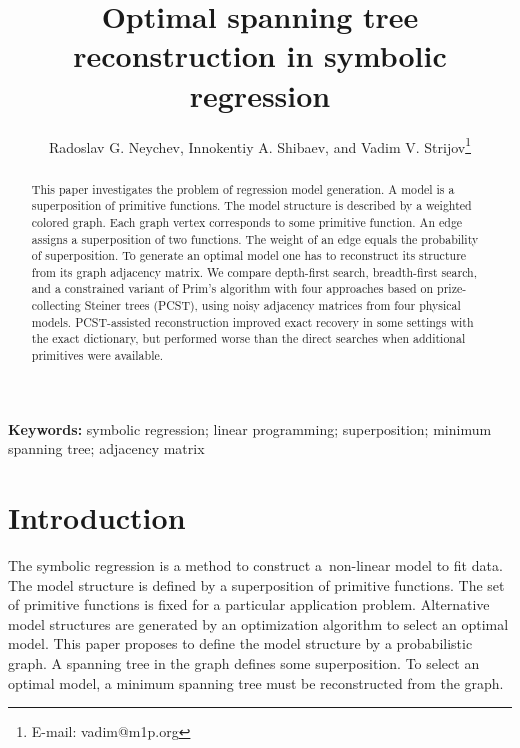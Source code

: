 \documentclass[12pt]{article}
\newif\ifhighlight \highlighttrue
\begin{document}
\title{Optimal spanning tree reconstruction in symbolic regression}
\author{Radoslav G. Neychev, Innokentiy A. Shibaev, and Vadim V. Strijov\footnote{E-mail: vadim@m1p.org}}
\maketitle

\begin{abstract}
This paper investigates the problem of regression model generation. A model is a superposition of primitive functions. The model structure is described by a weighted colored graph. Each graph vertex corresponds to some primitive function. An edge assigns a superposition of two functions. The weight of an edge equals the probability of superposition. To generate an optimal model one has to reconstruct its structure from its graph adjacency matrix.
{\ifhighlight\color{blue}\fi We compare depth-first search, breadth-first search, and a constrained variant of Prim's algorithm with four approaches based on prize-collecting Steiner trees (PCST), using noisy adjacency matrices from four physical models. PCST-assisted reconstruction improved exact recovery in some settings with the exact dictionary, but performed worse than the direct searches when additional primitives were available.}
\end{abstract}

{\bf Keywords:} symbolic regression; linear programming; superposition; minimum spanning tree; adjacency matrix

\section{Introduction}
The symbolic regression is a method to construct a~non-linear model to fit data. The model structure is defined by a superposition of primitive functions. The set of primitive functions is fixed for a particular application problem. Alternative model structures are generated by an optimization algorithm to select an optimal model. This paper proposes to define the model structure by a probabilistic graph. A spanning tree in the graph defines some superposition. To select an optimal model, a minimum spanning tree must be reconstructed from the graph.
\end{document}
